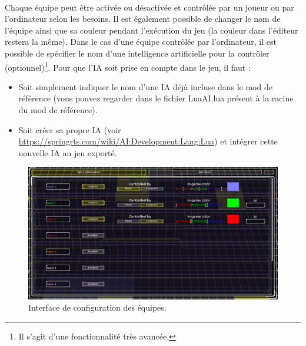 \documentclass[a4paper]{article}
\begin{document}
\paragraph{ }
Chaque équipe peut être activée ou désactivée et contrôlée par un joueur ou par l'ordinateur selon les besoins. Il est également possible de changer le nom de l'équipe ainsi que sa couleur pendant l'exécution du jeu (la couleur dans l'éditeur restera la même). Dans le cas d'une équipe contrôlée par l'ordinateur, il est possible de spécifier le nom d'une intelligence artificielle pour la contrôler (optionnel)\footnote{Il s'agit d'une fonctionnalité très avancée.}. Pour que l'IA soit prise en compte dans le jeu, il faut :
\begin{itemize}
\item Soit simplement indiquer le nom d'une IA déjà incluse dans le mod de référence (vous pouvez regarder dans le fichier LuaAI.lua présent à la racine du mod de référence).
\item Soit créer sa propre IA (voir \url{https://springrts.com/wiki/AI:Development:Lang:Lua}) et intégrer cette nouvelle IA au jeu exporté.
\end{itemize}
\begin{figure}[H]
\centering
\includegraphics[width=\linewidth]{editor-teamconfig.png}
\caption{Interface de configuration des équipes.}
\label{fig:editor-teamconfig}
\end{figure}
\end{document}
